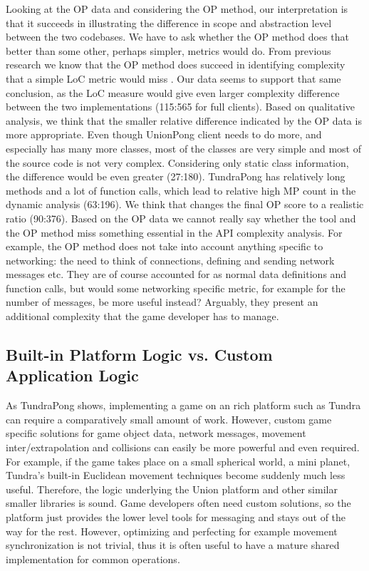 \documentclass[conference]{IEEEtran}
\begin{document}
Looking at the OP data and considering the OP method, our
interpretation is that it succeeds in illustrating the difference in
scope and abstraction level between the two codebases. We have to ask
whether the OP method does that better than some other, perhaps
simpler, metrics would do. From previous research we know that the OP
method does succeed in identifying complexity that a simple LoC metric
would miss \cite{api-complexity-analysis}. Our data seems to support that same
conclusion, as the LoC measure would give even larger complexity
difference between the two implementations (115:565 for full
clients). Based on qualitative analysis, we think that the smaller
relative difference indicated by the OP data is more appropriate. Even
though UnionPong client needs to do more, and especially has many more
classes, most of the classes are very simple and most of the source
code is not very complex. Considering only static class information,
the difference would be even greater (27:180). TundraPong has
relatively long methods and a lot of function calls, which lead to
relative high MP count in the dynamic analysis (63:196). We think that
changes the final OP score to a realistic ratio (90:376). Based on the
OP data we cannot really say whether the tool and the OP method miss
something essential in the API complexity analysis. For example, the
OP method does not take into account anything specific to networking:
the need to think of connections, defining and sending network messages
etc. They are of course accounted for as normal data definitions and
function calls, but would some networking specific metric, for example
for the number of messages, be more useful instead? Arguably, they
present an additional complexity that the game developer has to
manage.

\subsection{Built-in Platform Logic vs. Custom Application Logic}

As TundraPong shows, implementing a game on an rich platform such as
Tundra can require a comparatively small amount of work. However,
custom game specific solutions for game object data, network messages,
movement inter/extrapolation and collisions can easily be more
powerful and even required. For example, if the game takes place on a
small spherical world, a mini planet, Tundra’s built-in Euclidean
movement techniques become suddenly much less useful. Therefore, the
logic underlying the Union platform and other similar smaller
libraries is sound. Game developers often need custom solutions, so
the platform just provides the lower level tools for messaging and
stays out of the way for the rest. However, optimizing and perfecting
for example movement synchronization is not trivial, thus it is often
useful to have a mature shared implementation for common operations.
\end{document}

